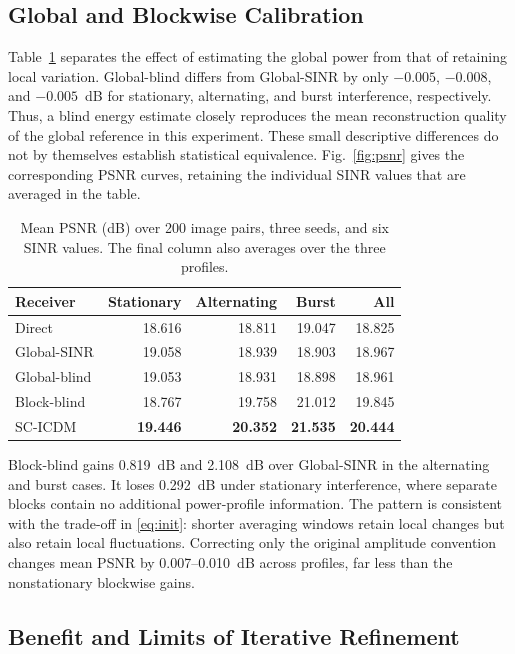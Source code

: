 \documentclass[conference]{IEEEtran}
\newcommand{\method}{SC-ICDM}
\begin{document}
\subsection{Global and Blockwise Calibration}

Table~\ref{tab:psnr} separates the effect of estimating the global power
from that of retaining local variation. Global-blind differs from
Global-SINR by only $-0.005$, $-0.008$, and $-0.005$~dB for stationary,
alternating, and burst interference, respectively. Thus, a blind energy
estimate closely reproduces the mean reconstruction quality of the
global reference in this experiment. These small descriptive differences
do not by themselves establish statistical equivalence.
Fig.~\ref{fig:psnr} gives the corresponding PSNR curves, retaining the
individual SINR values that are averaged in the table.

\begin{table}[t]
\caption{Mean PSNR (dB) over 200 image pairs, three seeds, and six SINR values.
The final column also averages over the three profiles.}
\label{tab:psnr}
\centering
\setlength{\tabcolsep}{3.4pt}
\begin{tabular}{lrrrr}
\toprule
Receiver & Stationary & Alternating & Burst & All\\
\midrule
Direct       & 18.616 & 18.811 & 19.047 & 18.825\\
Global-SINR  & 19.058 & 18.939 & 18.903 & 18.967\\
Global-blind & 19.053 & 18.931 & 18.898 & 18.961\\
Block-blind  & 18.767 & 19.758 & 21.012 & 19.845\\
\method{}    & \textbf{19.446} & \textbf{20.352}
             & \textbf{21.535} & \textbf{20.444}\\
\bottomrule
\end{tabular}
\end{table}

Block-blind gains 0.819~dB and 2.108~dB over Global-SINR in the
alternating and burst cases. It loses 0.292~dB under stationary
interference, where separate blocks contain no additional power-profile
information. The pattern is consistent with the trade-off in
\eqref{eq:init}: shorter averaging windows retain local changes but also
retain local fluctuations. Correcting only the original amplitude
convention changes mean PSNR by 0.007--0.010~dB across profiles, far
less than the nonstationary blockwise gains.

\subsection{Benefit and Limits of Iterative Refinement}
\end{document}
